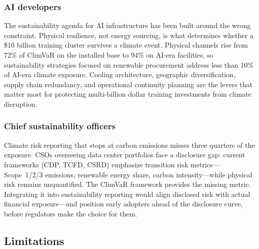 \begin{twocolbody}
\subsubsection*{AI developers}

The sustainability agenda for AI infrastructure has been built around the wrong constraint. Physical resilience, not energy sourcing, is what determines whether a \$10 billion training cluster survives a climate event. Physical channels rise from 72\% of ClimVaR on the installed base to 94\% on AI-era facilities, so sustainability strategies focused on renewable procurement address less than 10\% of AI-era climate exposure. Cooling architecture, geographic diversification, supply chain redundancy, and operational continuity planning are the levers that matter most for protecting multi-billion dollar training investments from climate disruption.

\subsubsection*{Chief sustainability officers}

Climate risk reporting that stops at carbon emissions misses three quarters of the exposure. CSOs overseeing data center portfolios face a disclosure gap: current frameworks (CDP, TCFD, CSRD) emphasize transition risk metrics---Scope~1/2/3 emissions, renewable energy share, carbon intensity---while physical risk remains unquantified. The ClimVaR framework provides the missing metric. Integrating it into sustainability reporting would align disclosed risk with actual financial exposure---and position early adopters ahead of the disclosure curve, before regulators make the choice for them.

\end{twocolbody}

\subsection*{Limitations}\label{toc:limitations}
\greensep

